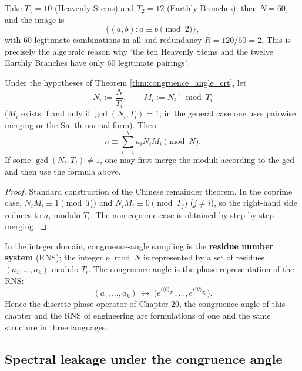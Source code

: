 \begin{corollary}\label{cor:sexagenary_congruence}
Take $T_1=10$ (Heavenly Stems) and $T_2=12$ (Earthly Branches); then $N=60$, and the image is
\[
\{(a,b):a\equiv b\pmod 2\},
\]
with $60$ legitimate combinations in all and redundancy $R=120/60=2$. This is precisely the algebraic reason why `the ten Heavenly Stems and the twelve Earthly Branches have only $60$ legitimate pairings'.
\end{corollary}

\begin{theorem}\label{thm:congruence_angle_reconstruction}
Under the hypotheses of Theorem \ref{thm:congruence_angle_crt}, let
\[
N_i:=\frac{N}{T_i},\qquad M_i:=N_i^{-1}\bmod T_i
\]
($M_i$ exists if and only if $\gcd(N_i,T_i)=1$; in the general case one uses pairwise merging or the Smith normal form). Then
\[
n\equiv\sum_{i=1}^k a_i N_i M_i\pmod N.
\]
If some $\gcd(N_i,T_i)\ne1$, one may first merge the moduli according to the gcd and then use the formula above.
\end{theorem}

\begin{proof}
Standard construction of the Chinese remainder theorem. In the coprime case, $N_iM_i\equiv1\pmod{T_i}$ and $N_iM_i\equiv0\pmod{T_j}$ ($j\ne i$), so the right-hand side reduces to $a_i$ modulo $T_i$. The non-coprime case is obtained by step-by-step merging.
\end{proof}

\begin{remark}\label{rem:congruence_angle_rns}
In the integer domain, congruence-angle sampling is the \textbf{residue number system} (RNS): the integer $n\bmod N$ is represented by a set of residues $(a_1,\dots,a_k)$ modulo $T_i$. The congruence angle is the phase representation of the RNS:
\[
(a_1,\dots,a_k)\ \longleftrightarrow\ \big(e^{i\langle\theta\rangle_{T_1}},\dots,e^{i\langle\theta\rangle_{T_k}}\big).
\]
Hence the discrete phase operator of Chapter 20, the congruence angle of this chapter and the RNS of engineering are formulations of one and the same structure in three languages.
\end{remark}

\subsection{Spectral leakage under the congruence angle}

